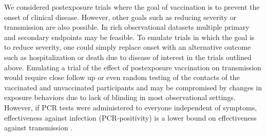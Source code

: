 \documentclass[11pt]{article}
\begin{document}
We considered postexposure trials where the goal of vaccination is to prevent the onset of clinical disease. However, other goals such as reducing severity or transmission are also possible. In rich observational datasets multiple primary and secondary endpoints may be feasible. To emulate trials in which the goal is to reduce severity, one could simply replace onset with an alternative outcome such as hospitalization or death due to disease of interest in the trials outlined above. Emulating a trial of the effect of postexposure vaccination on transmission would require close follow up or even random testing of the contacts of the vaccinated and unvaccinated participants and may be compromised by changes in exposure behaviors due to lack of blinding in most observational settings. However, if PCR tests were administered to everyone independent of symptoms, effectiveness against infection (PCR-positivity) is a lower bound on effectiveness against transmission \cite{lipsitch_interpreting_2021}. 


\clearpage

\newpage

\printbibliography

\clearpage



\onehalfspacing
\end{document}

